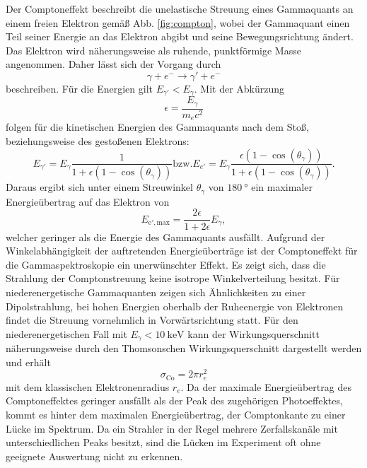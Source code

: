 Der Comptoneffekt beschreibt die unelastische Streuung eines Gammaquants an einem freien Elektron gemäß Abb. \ref{fig:compton}, wobei der Gammaquant einen Teil seiner Energie an das Elektron abgibt und seine Bewegungsrichtung ändert. Das Elektron wird näherungsweise als ruhende, punktförmige Masse angenommen. Daher lässt sich der Vorgang durch
\begin{equation}
    \gamma + e^- \to \gamma' + e^-
\end{equation}
beschreiben. Für die Energien gilt $E_{\gamma'} < E_\gamma$.
Mit der Abkürzung
\begin{equation}
    \epsilon = \frac{E_\gamma}{m_e c^2} \label{eq:eps}
\end{equation}
folgen für die kinetischen Energien des Gammaquants nach dem Stoß, beziehungsweise des gestoßenen Elektrons:
\begin{equation}
    E_{\gamma'} =  E_\gamma \frac{1}{1+ \epsilon (1-\cos(\theta_\gamma))} \text{bzw.} E_{e'} =  E_\gamma \frac{\epsilon (1-\cos(\theta_\gamma))}{1+ \epsilon (1-\cos(\theta_\gamma))} . \label{eq:ecomp}
\end{equation}
Daraus ergibt sich unter einem Streuwinkel $\theta_\gamma$ von $\SI{180}{\degree}$ ein maximaler Energieübertrag auf das Elektron von
\begin{equation}
    E_{\text{e}',\text{max}} = \frac{2 \epsilon}{1 + 2 \epsilon} E_\gamma , \label{eq:emaxcomp}
\end{equation}
welcher geringer als die Energie des Gammaquants ausfällt. %
Aufgrund der Winkelabhängigkeit der auftretenden Energieüberträge ist der Comptoneffekt für die Gammaspektroskopie ein unerwünschter Effekt. Es zeigt sich, dass die Strahlung der Comptonstreuung keine isotrope Winkelverteilung besitzt. Für niederenergetische Gammaquanten zeigen sich Ähnlichkeiten zu einer Dipolstrahlung, bei hohen Energien oberhalb der Ruheenergie von Elektronen findet die Streuung vornehmlich in Vorwärtsrichtung statt. Für den niederenergetischen Fall mit $E_\gamma < \SI{10}{\kilo\electronvolt}$ kann der Wirkungsquerschnitt näherungsweise durch den Thomsonschen Wirkungsquerschnitt dargestellt werden und erhält
\begin{equation}
    \sigma_\text{Co} = 2 \pi r_e^2
\end{equation}
mit dem klassischen Elektronenradius $r_e$. Da der maximale Energieübertrag des Comptoneffektes geringer ausfällt als der Peak des zugehörigen Photoeffektes, kommt es hinter dem maximalen Energieübertrag, der Comptonkante zu einer Lücke im Spektrum. Da ein Strahler in der Regel mehrere Zerfallskanäle mit unterschiedlichen Peaks besitzt, sind die Lücken im Experiment oft ohne geeignete Auswertung nicht zu erkennen.%

